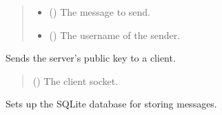 \documentclass[letterpaper,10pt,english]{sphinxmanual}
\begin{document}
\begin{fulllineitems}
\begin{fulllineitems}
\begin{quote}
\begin{description}
\begin{itemize}
\item {} 
\sphinxAtStartPar
{} () \textendash{} The message to send.

\item {} 
\sphinxAtStartPar
{} () \textendash{} The username of the sender.

\end{itemize}

\end{description}\end{quote}

\end{fulllineitems}


\begin{fulllineitems}
\label{\detokenize{server1:server1.Server.send_public_key}}
\pysigstartsignatures
{}
\pysigstopsignatures
\sphinxAtStartPar
Sends the server’s public key to a client.
\begin{quote}\begin{description}
\sphinxAtStartPar
{} () \textendash{} The client socket.

\end{description}\end{quote}

\end{fulllineitems}


\begin{fulllineitems}
\label{\detokenize{server1:server1.Server.setup_database}}
\pysigstartsignatures
{}
\pysigstopsignatures
\sphinxAtStartPar
Sets up the SQLite database for storing messages.

\end{fulllineitems}



\end{fulllineitems}
\end{document}
